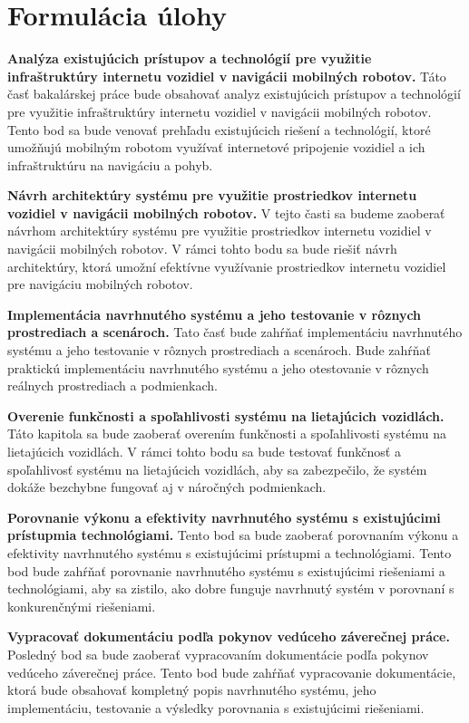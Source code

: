 \section{Formulácia úlohy}
\textbf{Analýza existujúcich prístupov a technológií pre využitie infraštruktúry internetu vozidiel v navigácii mobilných robotov.} 
Táto časť bakalárskej práce bude obsahovať analyz existujúcich prístupov a technológií pre využitie infraštruktúry internetu vozidiel v navigácii mobilných robotov. Tento bod sa bude venovať prehľadu existujúcich riešení a technológií, ktoré umožňujú mobilným robotom využívať internetové pripojenie vozidiel a ich infraštruktúru na navigáciu a pohyb.

\textbf{Návrh architektúry systému pre využitie prostriedkov internetu vozidiel v navigácii mobilných robotov.} 
V tejto časti sa budeme zaoberať návrhom architektúry systému pre využitie prostriedkov internetu vozidiel v navigácii mobilných robotov. V rámci tohto bodu sa bude riešiť návrh architektúry, ktorá umožní efektívne využívanie prostriedkov internetu vozidiel pre navigáciu mobilných robotov.

\textbf{Implementácia navrhnutého systému a jeho testovanie v rôznych prostrediach a scenároch.} 
Tato časť bude zahŕňať implementáciu navrhnutého systému a jeho testovanie v rôznych prostrediach a scenároch. Bude zahŕňať praktickú implementáciu navrhnutého systému a jeho otestovanie v rôznych reálnych prostrediach a podmienkach.

\textbf{Overenie funkčnosti a spoľahlivosti systému na lietajúcich vozidlách.} 
Táto kapitola sa bude zaoberať overením funkčnosti a spoľahlivosti systému na lietajúcich vozidlách. V rámci tohto bodu sa bude testovať funkčnosť a spoľahlivosť systému na lietajúcich vozidlách, aby sa zabezpečilo, že systém dokáže bezchybne fungovať aj v náročných podmienkach.

\textbf{Porovnanie výkonu a efektivity navrhnutého systému s existujúcimi prístupmia technológiami.} 
Tento bod sa bude zaoberať porovnaním výkonu a efektivity navrhnutého systému s existujúcimi prístupmi a technológiami. Tento bod bude zahŕňať porovnanie navrhnutého systému s existujúcimi riešeniami a technológiami, aby sa zistilo, ako dobre funguje navrhnutý systém v porovnaní s konkurenčnými riešeniami.

\textbf{Vypracovať dokumentáciu podľa pokynov vedúceho záverečnej práce.} 
Posledný bod sa bude zaoberať vypracovaním dokumentácie podľa pokynov vedúceho záverečnej práce. Tento bod bude zahŕňať vypracovanie dokumentácie, ktorá bude obsahovať kompletný popis navrhnutého systému, jeho implementáciu, testovanie a výsledky porovnania s existujúcimi riešeniami.
